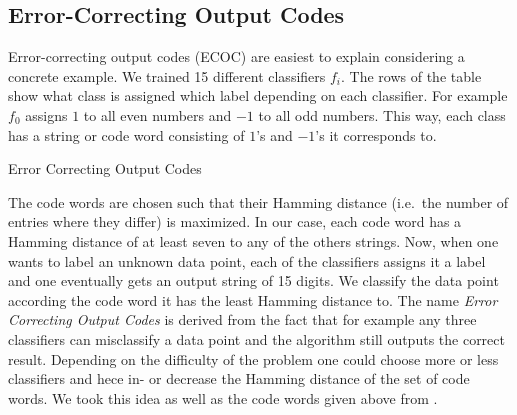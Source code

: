 \subsection{Error-Correcting Output Codes}
Error-correcting output codes (ECOC) are easiest to explain considering a concrete example. We trained 15 different classifiers $f_i$. The rows of the table show what class is assigned which label depending on each classifier. For example $f_0$ assigns $1$ to all even numbers and $-1$ to all odd numbers. This way, each class has a string or code word consisting of $1$'s and $-1$'s it corresponds to.

\begin{table}[ht!]
	\centering
	\caption{Error Correcting Output Codes}
	\label{Codewords}
	
\end{table}  

The code words are chosen such that their Hamming distance (i.e.\ the number of entries where they differ) is maximized. In our case, each code word has a Hamming distance of at least seven to any of the others strings. Now, when one wants to label an unknown data point, each of the classifiers assigns it a label and one eventually gets an output string of 15 digits. We classify the data point according the code word it has the least Hamming distance to. The name \textit{Error Correcting Output Codes} is derived from the fact that for example any three classifiers can misclassify a data point and the algorithm still outputs the correct result. Depending on the difficulty of the problem one could choose more or less classifiers and hece in- or decrease the Hamming distance of the set of code words. We took this idea as well as the code words given above from \cite{dietterich1995solving}.


